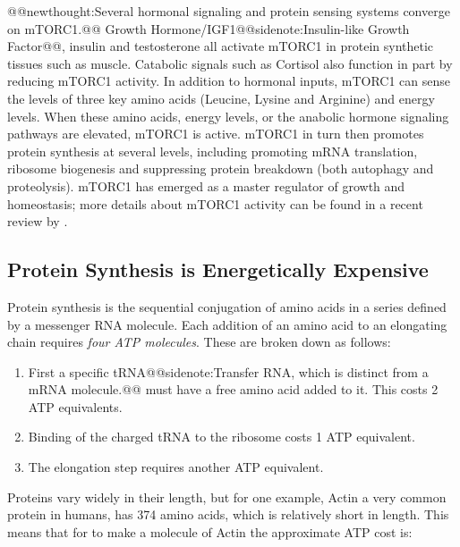 \documentclass{tufte-handout}
\makeatletter
\def\newthought#1{@@newthought:#1@@}
\def\sidenote#1{@@sidenote:#1@@}
\makeatother
\begin{document}
\newthought{Several hormonal signaling and protein sensing systems converge on mTORC1.}  Growth Hormone/IGF1\sidenote{Insulin-like Growth Factor}, insulin and testosterone all activate mTORC1 in protein synthetic tissues such as muscle.  Catabolic signals such as Cortisol also function in part by reducing mTORC1 activity.  In addition to hormonal inputs, mTORC1 can sense the levels of three key amino acids (Leucine, Lysine and Arginine) and energy levels.  When these amino acids, energy levels, or the anabolic hormone signaling pathways are elevated, mTORC1 is active.  mTORC1 in turn then promotes protein synthesis at several levels, including promoting mRNA translation, ribosome biogenesis and suppressing protein breakdown (both autophagy and proteolysis).  mTORC1 has emerged as a master regulator of growth and homeostasis; more details about mTORC1 activity can be found in a recent review by \citet{Saxton2017}.

\subsection{Protein Synthesis is Energetically Expensive}

Protein synthesis is the sequential conjugation of amino acids in a series defined by a messenger RNA molecule.  Each addition of an amino acid to an elongating chain requires \emph{four ATP molecules}.  These are broken down as follows:

\begin{enumerate}
\item First a specific tRNA\sidenote{Transfer RNA, which is distinct from a mRNA molecule.} must have a free amino acid added to it.  This costs 2 ATP equivalents.
\item Binding of the charged tRNA to the ribosome costs 1 ATP equivalent.
\item The elongation step requires another ATP equivalent.
\end{enumerate}

Proteins vary widely in their length, but for one example, Actin a very common protein in humans, has 374 amino acids, which is relatively short in length.  This means that for to make a molecule of Actin the approximate ATP cost is:
\end{document}
